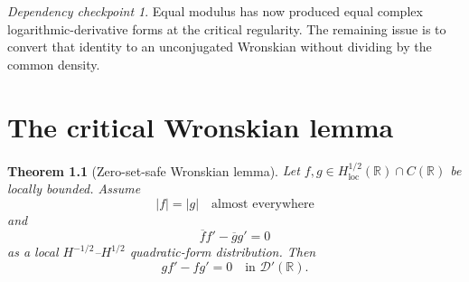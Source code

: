 \documentclass[11pt,oneside]{book}
\newtheorem{theorem}{Theorem}[chapter]
\theoremstyle{definition}
\theoremstyle{remark}
\newtheorem{checkpoint}[theorem]{Dependency checkpoint}
\newcommand{\R}{\mathbb R}
\newcommand{\D}{\mathcal D}
\newcommand{\1}{\mathbf 1}
\newcommand{\loc}{\mathrm{loc}}
\begin{document}
\begin{checkpoint}
Equal modulus has now produced equal complex logarithmic-derivative forms at
the critical regularity.  The remaining issue is to convert that identity to
an unconjugated Wronskian without dividing by the common density.
\end{checkpoint}

\chapter{The critical Wronskian lemma}\label{chap:wronskian}

\begin{theorem}[Zero-set-safe Wronskian lemma]\label{thm:critical-wronskian}
Let $f,g\in H^{1/2}_{\loc}(\R)\cap C(\R)$ be locally bounded.  Assume
\begin{equation}
 |f|=|g|\quad\text{almost everywhere}               \label{eq:W-density}
\end{equation}
and
\begin{equation}
 \overline f f'-\overline g g'=0                   \label{eq:W-log}
\end{equation}
as a local $H^{-1/2}$--$H^{1/2}$ quadratic-form distribution.  Then
\begin{equation}
  g f'-f g'=0\quad\text{in }\D'(\R).               \label{eq:W-zero}
\end{equation}
\end{theorem}
\end{document}
